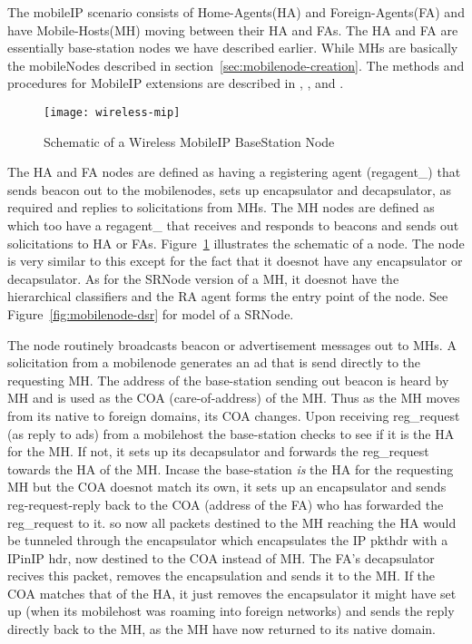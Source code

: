 {The mobileIP scenario consists of Home-Agents(HA) and Foreign-Agents(FA) and have Mobile-Hosts(MH) moving between their HA and FAs.
The HA and FA are essentially base-station nodes we have described earlier. While MHs are basically the mobileNodes described in section~\ref{sec:mobilenode-creation}.
The methods and procedures for MobileIP extensions are described in , ,  and .

\begin{figure}
    \centerline{\texttt{[image: wireless-mip]}}
    \caption{Schematic of a Wireless MobileIP BaseStation Node}
    \label{fig:mobilenode-wireless-mip}
\end{figure}
The HA and FA nodes are defined as  having a registering agent (regagent\_) that sends beacon out to the mobilenodes, sets up encapsulator and decapsulator, as required and replies to solicitations from MHs. 
The MH nodes are defined as  which too have a regagent\_ that receives and responds to beacons and sends out solicitations to HA or FAs. Figure~\ref{fig:mobilenode-wireless-mip} illustrates the schematic of a  node. The  node is very similar to this except for the fact that it doesnot have any encapsulator or decapsulator. As for the SRNode version of a MH, it doesnot have the hierarchical classifiers and the RA agent forms the entry point of the node. See Figure~\ref{fig:mobilenode-dsr} for model of a SRNode.

The  node routinely broadcasts beacon or advertisement messages out to MHs. A solicitation from a mobilenode generates an ad that is send directly to the requesting MH. The address of the base-station sending out beacon is heard by MH and is used as the COA (care-of-address) of the MH. Thus as the MH moves from its native to foreign domains, its COA changes.
Upon receiving  reg\_request (as reply to ads) from a mobilehost the base-station checks to see if it is the HA for the MH. If not, it sets up its decapsulator and forwards the reg\_request towards the HA of the MH. 
Incase the base-station {\em is} the HA for the requesting MH but the COA doesnot match its own, it sets up an encapsulator and sends reg-request-reply back to the COA (address of the FA) who has forwarded the reg\_request to it. so now all packets destined to the MH reaching the HA would be tunneled through the encapsulator which encapsulates the IP pkthdr with a IPinIP hdr, now destined to the COA instead of MH. The FA's decapsulator recives this packet, removes the encapsulation and sends it to the MH.
If the COA matches that of the HA, it just removes the encapsulator it might have set up (when its mobilehost was roaming into foreign networks) and sends the reply directly back to the MH, as the MH have now returned to its native domain.

}
